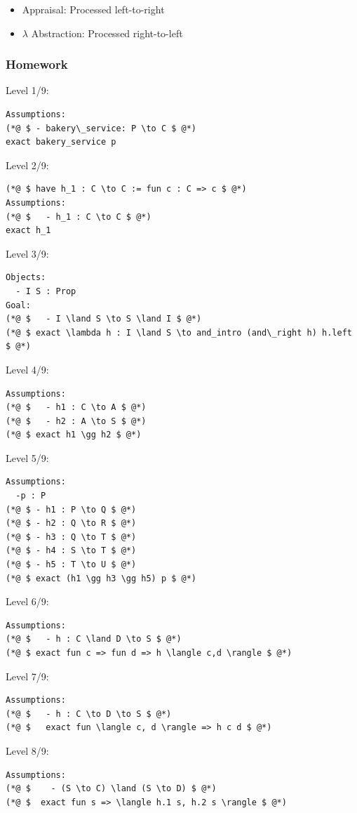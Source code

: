 \documentclass{article}
\theoremstyle{theorem}
\theoremstyle{definition}
\theoremstyle{remark}
\begin{document}
\begin{itemize}
  \item Appraisal: Processed left-to-right
  \item $\lambda$ Abstraction: Processed right-to-left
\end{itemize}

\subsubsection*{Homework}

Level 1/9:
\begin{lstlisting}
Assumptions:
(*@ $ - bakery\_service: P \to C $ @*)
exact bakery_service p
\end{lstlisting}

Level 2/9:
\begin{lstlisting}
(*@ $ have h_1 : C \to C := fun c : C => c $ @*)
Assumptions:
(*@ $   - h_1 : C \to C $ @*)
exact h_1
\end{lstlisting}

Level 3/9:
\begin{lstlisting}
Objects:
  - I S : Prop
Goal:
(*@ $   - I \land S \to S \land I $ @*)
(*@ $ exact \lambda h : I \land S \to and_intro (and\_right h) h.left $ @*)
\end{lstlisting}

Level 4/9:
\begin{lstlisting}
Assumptions:
(*@ $   - h1 : C \to A $ @*)
(*@ $   - h2 : A \to S $ @*)
(*@ $ exact h1 \gg h2 $ @*)
\end{lstlisting}

Level 5/9:
\begin{lstlisting}
Assumptions:
  -p : P
(*@ $ - h1 : P \to Q $ @*)
(*@ $ - h2 : Q \to R $ @*)
(*@ $ - h3 : Q \to T $ @*)
(*@ $ - h4 : S \to T $ @*)
(*@ $ - h5 : T \to U $ @*)
(*@ $ exact (h1 \gg h3 \gg h5) p $ @*)
\end{lstlisting}

Level 6/9:
\begin{lstlisting}
Assumptions:
(*@ $   - h : C \land D \to S $ @*)
(*@ $ exact fun c => fun d => h \langle c,d \rangle $ @*)
\end{lstlisting}

Level 7/9:
\begin{lstlisting}
Assumptions:
(*@ $   - h : C \to D \to S $ @*)
(*@ $   exact fun \langle c, d \rangle => h c d $ @*)
\end{lstlisting}

Level 8/9:
\begin{lstlisting}
Assumptions:
(*@ $    - (S \to C) \land (S \to D) $ @*)
(*@ $  exact fun s => \langle h.1 s, h.2 s \rangle $ @*)
\end{lstlisting}
\end{document}
